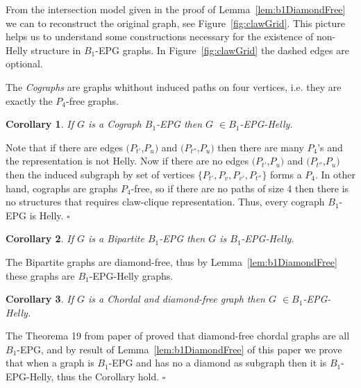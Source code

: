 \documentclass[9pt]{entcs}
\newtheorem{coro}{Corollary}[section]
\begin{document}
From the intersection model given in the proof of Lemma~\ref{lem:b1DiamondFree} we can to reconstruct the original graph, see Figure~\ref{fig:clawGrid}. This picture helps us to understand some constructions necessary for the existence of non-Helly structure in $B_1$-EPG graphs. In Figure~\ref{fig:clawGrid} the dashed edges are optional.



The \textit{Cographs} are graphs whithout induced paths on four vertices, i.e. they are exactly the $P_4$-free graphs.


\begin{coro}
If $G$ is a Cograph $B_1$-EPG then $G$ $\in B_1$-EPG-Helly.
\end{coro}

\begin{pf}
Note that if there are edges $(P_{t'}$,$P_{u})$ and $(P_{t''}$,$P_{u})$ then there are many $P_4$'s and the representation is not Helly. Now if there are no edges $(P_{t'}$,$P_{u})$ and $(P_{t''}$,$P_{u})$ then the induced subgraph by set of vertices $\{P_{t'}, P_{v}, P_{v'}, P_{t''}\}$ forms a $P_4$. In other hand, cographs are graphs $P_4$-free, so if there are no paths of size 4 then there is no structures that requires claw-clique representation. %
Thus, every cograph $B_1$-EPG is Helly.
 $\square$\end{pf} 

\begin{coro}
If $G$ is a Bipartite $B_1$-EPG then $G$ is $B_1$-EPG-Helly.
\end{coro}

\begin{pf}
The Bipartite graphs are diamond-free, thus by Lemma~\ref{lem:b1DiamondFree} these graphs are $B_1$-EPG-Helly graphs.
\end{pf}


\begin{coro}\label{lem:cdf}
If $G$ is a Chordal and diamond-free graph then $G$ $ \in B_1$-EPG-Helly.
\end{coro}

\begin{pf}
The Theorema 19 from paper of \cite{ries2009} proved that diamond-free chordal graphs are all $B_1$-EPG, and by result of Lemma~\ref{lem:b1DiamondFree} of this paper we prove that when a graph is $B_1$-EPG and has no a diamond as subgraph then it is $B_1$-EPG-Helly, thus the Corollary hold.
 $\square$\end{pf} 
\end{document}
